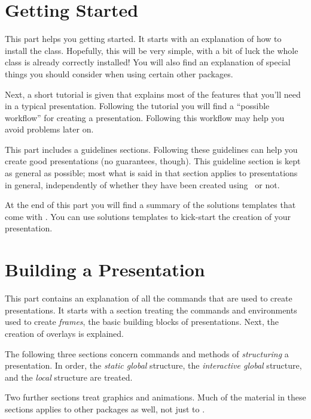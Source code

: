 \documentclass{ltxdoc}
\begin{document}
\part{Getting Started}

This part helps you getting started. It starts with an explanation of
how to install the class. Hopefully, this will be very simple, with a
bit of luck the whole class is already correctly installed! You will
also find an explanation of special things you should consider when
using certain other packages.

Next, a short tutorial is given that explains most of the features
that you'll need in a typical presentation. Following the tutorial you
will find a ``possible workflow'' for creating a
presentation. Following this workflow may help you avoid problems
later on.

This part includes a guidelines sections. Following these guidelines
can help you create good presentations (no guarantees, though). This
guideline section is kept as general as possible; most what is said in
that section applies to presentations in general, independently of
whether they have been created using \beamer\ or not.

At the end of this part you will find a summary of the solutions
templates that come with \beamer. You can use solutions templates to
kick-start the creation of your presentation.









\part{Building a Presentation}

This part contains an explanation of all the commands that are used to
create presentations. It starts with a section treating the commands
and environments used to create \emph{frames}, the basic building
blocks of presentations. Next, the creation of overlays is
explained.

The following three sections concern commands and methods
of \emph{structuring} a presentation. In order, the \emph{static
  global} structure, the \emph{interactive global} structure, and the
\emph{local} structure are treated.

Two further sections treat graphics and animations. Much of the
material in these sections applies to other packages as well, not just
to \beamer.
\end{document}
